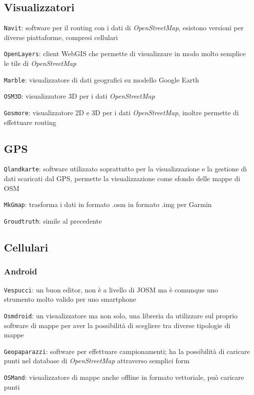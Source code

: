\documentclass[a4paper,twoside,12pt,]{article}
\newcommand{\osm}{\emph{OpenStreetMap}\xspace}
\newcommand{\gps}{GPS\xspace}
\newcommand{\soft}[1]{\texttt{#1}}
\begin{document}
\subsection{Visualizzatori}

\soft{Navit}: software per il routing con i dati di \osm, esistono versioni per diverse piattaforme, compresi cellulari

\soft{OpenLayers}: client WebGIS che permette di visualizzare in modo molto semplice le tile di \osm

\soft{Marble}: visualizzatore di dati geografici su modello Google Earth

\soft{OSM3D}: visualizzatore 3D per i dati \osm

\soft{Gosmore}: visualizzatore 2D e 3D per i dati \osm, inoltre permette di effettuare routing

\subsection{GPS}

\soft{Qlandkarte}: software utilizzato soprattutto per la visualizzazione e la gestione di dati scaricati dal \gps, permette la visualizzazione come sfondo delle mappe di OSM

\soft{MkGmap}: trasforma i dati in formato .osm in formato .img per Garmin

\soft{Groudtruth}: simile al precedente

\subsection{Cellulari}
\subsubsection{Android}

\soft{Vespucci}: un buon editor, non è a livello di JOSM ma è comunque uno strumento molto valido per uno smartphone

\soft{Osmdroid}: un visualizzatore ma non solo, una libreria da utilizzare sul proprio software di mappe per aver la possibilità di scegliere tra diverse tipologie di mappe

\soft{Geopaparazzi}: software per effettuare campionamenti; ha la possibilità di caricare punti nel database di \osm attraverso semplici form 

\soft{OSMand}: visualizzatore di mappe anche offline in formato vettoriale, può caricare punti
\end{document}
